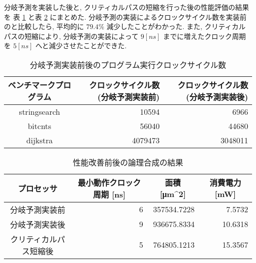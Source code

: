 \documentclass[../improvements.tex]{subfiles}
\begin{document}
  分岐予測を実装した後と, クリティカルパスの短縮を行った後の性能評価の結果を
  表 \ref{table:mibench-improved} と表 \ref{table:logic-synthesis-improved}
  にまとめた.
  分岐予測の実装によるクロックサイクル数を実装前のと比較したら, 
  平均的に $79.4\%$ 減少したことがわかった.
  また, クリティカルパスの短縮により, 分岐予測の実装によって $9[ns]$ までに増えたクロック周期を
  $5[ns]$ へと減少させたことができた.

  \begin{table}[h]
    \centering
    \begin{tabular}{|c|r|r|}
    \hline
    ベンチマークプログラム  & クロックサイクル数 (分岐予測実装前) & クロックサイクル数 (分岐予測実装後) \\ \hline
    stringsearch & 10594               & 6966                                     \\
    bitcnts      & 56040               & 44680                                    \\
    dijkstra     & 4079473             & 3048011                                  \\ \hline
    \end{tabular}
    \caption{分岐予測実装前後のプログラム実行クロックサイクル数}
    \label{table:mibench-improved}
  \end{table}

  \begin{table}[h]
    \centering
    \begin{tabular}{|c|r|r|r|}
    \hline
    プロセッサ       & \multicolumn{1}{c|}{最小動作クロック周期 {[}ns{]}} & \multicolumn{1}{c|}{面積 {[}μm\textasciicircum{}2{]}} & \multicolumn{1}{c|}{消費電力 {[}mW{]}} \\ \hline
    分岐予測実装前         & 6                                        & 357534.7228                                       & 7.5732                             \\
    分岐予測実装後     & 9                                        & 936675.8334                                         & 10.6318                            \\
    クリティカルパス短縮後 & 5                                        & 764805.1213                                         & 15.3567                            \\ \hline
    \end{tabular}
    \caption{性能改善前後の論理合成の結果}
    \label{table:logic-synthesis-improved}
  \end{table}
\end{document}
